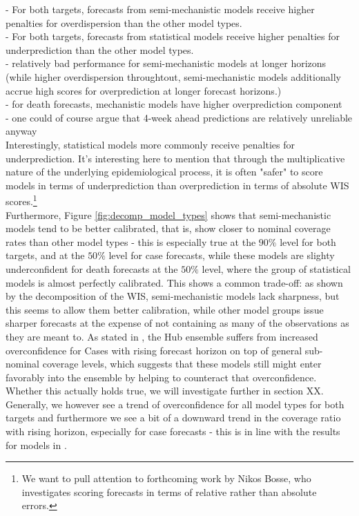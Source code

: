 - For both targets, forecasts from semi-mechanistic models receive higher penalties for overdispersion than the other model types.\\
- For both targets, forecasts from statistical models receive higher penalties for underprediction than the other model types.\\
- relatively bad performance for semi-mechanistic models at longer horizons (while higher overdispersion throughtout, semi-mechanistic models additionally accrue high scores for overprediction at longer forecast horizons.)\\
- for death forecasts, mechanistic models have higher overprediction component\\
- one could of course argue that 4-week ahead predictions are relatively unreliable anyway \\
Interestingly, statistical models more commonly receive penalties for underprediction. It's interesting here to mention that through the multiplicative nature of the underlying epidemiological process, it is often "safer" to score models in terms of underprediction than overprediction in terms of absolute WIS scores.\footnote{We want to pull attention to forthcoming work by Nikos Bosse, who investigates scoring forecasts in terms of relative rather than absolute errors.}  \\
Furthermore, Figure \ref{fig:decomp_model_types} shows that semi-mechanistic models tend to be better calibrated, that is, show closer to nominal coverage rates than other model types - this is especially true at the $90\%$ level for both targets, and at the $50\%$ level for case forecasts, while these models are slighty underconfident for death forecasts at the $50\%$ level, where the group of statistical models is almost perfectly calibrated. This shows a common trade-off: as shown by the decomposition of the WIS, semi-mechanistic models lack sharpness, but this seems to allow them better calibration, while other model groups issue sharper forecasts at the expense of not containing as many of the observations as they are meant to. As stated in \cite{sherratt_european_2022}, the Hub ensemble suffers from increased overconfidence for Cases with rising forecast horizon on top of general sub-nominal coverage levels, which suggests that these models still might enter favorably into the ensemble by helping to counteract that overconfidence. Whether this actually holds true, we will investigate further in section XX. Generally, we however see a trend of overconfidence for all model types for both targets and furthermore we see a bit of a downward trend in the coverage ratio with rising horizon, especially for case forecasts - this is in line with the results for models in \cite{sherratt_european_2022}. \\
